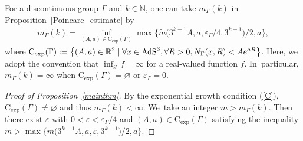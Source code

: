 \documentclass[11pt]{article}
\numberwithin{equation}{section}
\numberwithin{equation}{section}
\begin{document}
For a discontinuous group $\Gamma$ and $k\in \mathbb{N}$,
one can take $m_{\Gamma}(k)$ in Proposition~\ref{Poincare_estimate} by
\begin{gather}
\label{Poincare_estimate}
m_{\Gamma}(k)=\inf_{(A,a)\in \mathrm{C_{exp}}(\Gamma)}
\max\big\{\tilde{m}\big(3^{k-1}A,a,\varepsilon_{\Gamma}/4,3^{k-1}\big)/2,a\big\},
\end{gather}
where $\mathrm{C_{exp}}(\Gamma):=\big\{(A,a)\in \mathbb{R}^{2} \mid
\forall x\in \mathrm{AdS}^{3},\forall R>0, N_{\Gamma}(x,R) < A{\rm e}^{aR}\big\}$.
Here,
we adopt the convention that $\inf_{\varnothing} f =\infty$ for a real-valued function $f$. In~particular,
$m_{\Gamma}(k)=\infty$ when $\mathrm{C_{exp}}(\Gamma)=\varnothing$
or $\varepsilon_{\Gamma}=0$.
\begin{proof}[Proof of Proposition~\ref{mainthm}]
By the exponential growth condition (\ref{C}), $\mathrm{C_{exp}}(\Gamma)\neq\varnothing$
and thus $m_{\Gamma}(k)<\infty$. We~take an integer $m >m_{\Gamma}(k)$.
Then there exist $\varepsilon$ with $0<\varepsilon<\varepsilon_{\Gamma}/4$
and $(A,a)\in\mathrm{C_{exp}}(\Gamma)$
satisfying the inequality
$m > \max\big\{m\big(3^{k-1}A,a,\varepsilon,3^{k-1}\big)/2,a\big\}$.


\end{proof}
\end{document}
